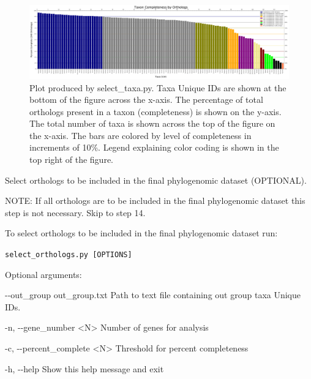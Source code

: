 \documentclass{article}
\def\code#1{\texttt{#1}}
\begin{document}
\begin{enumerate}[itemsep=12pt]
        \begin{figure}[H]
        \centering
        \includegraphics[width=\linewidth]{figures/taxa_comp.pdf}
        \caption{Plot produced by select\_taxa.py. Taxa Unique IDs are shown at the bottom of the figure across the x-axis. The percentage of total orthologs present in a taxon (completeness) is shown on the y-axis. The total number of taxa is shown across the top of the figure on the x-axis. The bars are colored by level of completeness in increments of 10\%. Legend explaining color coding is shown in the top right of the figure.}
        \label{Fig:taxacomp}
        \end{figure}
    
    \item Select orthologs to be included in the final phylogenomic dataset (OPTIONAL).
    
    \vspace{0.2cm}
    NOTE: If all orthologs are to be included in the final phylogenomic dataset this step is not necessary. Skip to step 14.
    
    \vspace{0.2cm}
    To select orthologs to be included in the final phylogenomic dataset run:
    
    \vspace{0.2cm}
    \code{select\_orthologs.py [OPTIONS]}
    \vspace{0.2cm}
    
    \begin{description}
        \item Optional arguments:
        \begin{description}
            \item -\/-out\_group \hspace{0.2cm} out\_group.txt \hspace{0.2cm} Path to text file containing out group taxa Unique IDs.
            \item -n, -\/-gene\_number \hspace{0.2cm} <N> \hspace{0.2cm} Number of genes for analysis
            \item -c, -\/-percent\_complete \hspace{0.2cm} <N> \hspace{0.2cm} Threshold for percent completeness
            \item -h, -\/-help \hspace{0.2cm} Show this help message and exit
        \end{description}
        

\end{description}
\end{enumerate}
\end{document}
